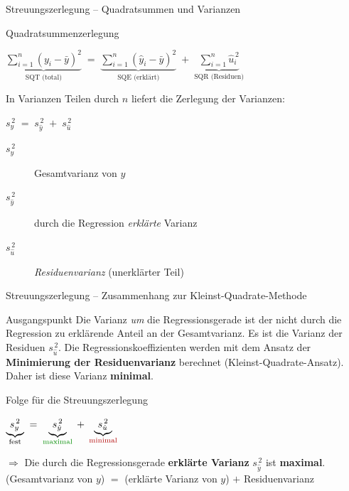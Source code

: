 \documentclass[aspectratio=169,11pt]{beamer}
\begin{document}
\begin{frame}{Streuungszerlegung -- Quadratsummen und Varianzen}
  \begin{block}{Quadratsummenzerlegung}
    \begin{center}
      $\displaystyle
        \underbrace{\sum_{i=1}^{n} (y_i - \bar{y})^2}_{\text{SQT (total)}}
        \;=\;
        \underbrace{\sum_{i=1}^{n} (\hat{y}_i - \bar{y})^2}_{\text{SQE (erklärt)}}
        \;+\;
        \underbrace{\sum_{i=1}^{n} \hat{u}_i^{\,2}}_{\text{SQR (Residuen)}}$
    \end{center}
  \end{block}

  \begin{exampleblock}{In Varianzen}
    Teilen durch $n$ liefert die Zerlegung der Varianzen:
    \begin{center}
      $\displaystyle s_y^{\,2} \;=\; s_{\hat{y}}^{\,2} \;+\; s_{\hat{u}}^{\,2}$
    \end{center}
    \begin{description}
      \item[$s_y^{\,2}$] Gesamtvarianz von $y$
      \item[$s_{\hat{y}}^{\,2}$] durch die Regression \emph{erklärte} Varianz
      \item[$s_{\hat{u}}^{\,2}$] \emph{Residuenvarianz} (unerklärter Teil)
    \end{description}
  \end{exampleblock}
\end{frame}

\begin{frame}{Streuungszerlegung -- Zusammenhang zur Kleinst-Quadrate-Methode}
  \begin{block}{Ausgangspunkt}
    Die Varianz \emph{um} die Regressionsgerade ist der nicht durch
    die Regression zu erklärende Anteil an der Gesamtvarianz. Es ist
    die Varianz der Residuen $s_{\hat{u}}^{\,2}$. Die Regressions\-koeffizienten
    werden mit dem Ansatz der \textbf{Minimierung der Residuenvarianz}
    berechnet (Kleinst-Quadrate-Ansatz). Daher ist diese Varianz
    \textbf{minimal}.
  \end{block}

  \begin{exampleblock}{Folge für die Streuungszerlegung}
    \begin{center}
      $\displaystyle
        \underbrace{s_y^{\,2}}_{\text{fest}}
        \;=\;
        \underbrace{s_{\hat{y}}^{\,2}}_{\text{\color{green!55!black}maximal}}
        \;+\;
        \underbrace{s_{\hat{u}}^{\,2}}_{\text{\color{red!70!black}minimal}}$
    \end{center}
    $\Rightarrow$ Die durch die Regressionsgerade \textbf{erklärte
    Varianz} $s_{\hat{y}}^{\,2}$ ist \textbf{maximal}.\\[0.4em]
    (Gesamtvarianz von $y$) $=$ (erklärte Varianz von $y$) $+$
    Residuenvarianz
  \end{exampleblock}
\end{frame}
\end{document}
